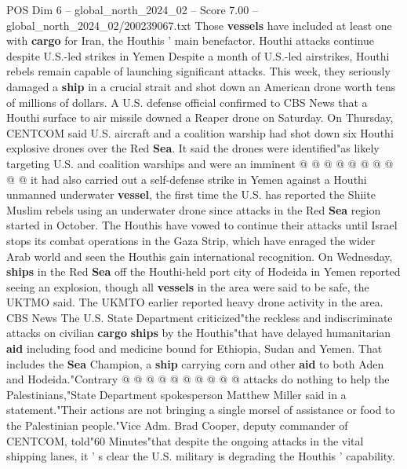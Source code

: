 \begin{textsample}{POS Dim 6 – global\_north\_2024\_02 – Score 7.00 – global\_north\_2024\_02/200239067.txt}
Those \textbf{vessels} have included at least one with \textbf{cargo} for Iran, the Houthis ' main benefactor.
Houthi attacks continue despite U.S.-led strikes in Yemen Despite a month of U.S.-led airstrikes, Houthi rebels remain capable of launching significant attacks.
This week, they seriously damaged a \textbf{ship} in a crucial strait and shot down an American drone worth tens of millions of dollars.
A U.S. defense official confirmed to CBS News that a Houthi surface to air missile downed a Reaper drone on Saturday.
On Thursday, CENTCOM said U.S. aircraft and a coalition warship had shot down six Houthi explosive drones over the Red \textbf{Sea}.
It said the drones were identified"as likely targeting U.S. and coalition warships and were an imminent @ @ @ @ @ @ @ @ @ @ it had also carried out a self-defense strike in Yemen against a Houthi unmanned underwater \textbf{vessel}, the first time the U.S. has reported the Shiite Muslim rebels using an underwater drone since attacks in the Red \textbf{Sea} region started in October.
The Houthis have vowed to continue their attacks until Israel stops its combat operations in the Gaza Strip, which have enraged the wider Arab world and seen the Houthis gain international recognition.
On Wednesday, \textbf{ships} in the Red \textbf{Sea} off the Houthi-held port city of Hodeida in Yemen reported seeing an explosion, though all \textbf{vessels} in the area were said to be safe, the UKTMO said.
The UKMTO earlier reported heavy drone activity in the area.
CBS News The U.S.
State Department criticized"the reckless and indiscriminate attacks on civilian \textbf{cargo} \textbf{ships} by the Houthis"that have delayed humanitarian \textbf{aid} including food and medicine bound for Ethiopia, Sudan and Yemen.
That includes the \textbf{Sea} Champion, a \textbf{ship} carrying corn and other \textbf{aid} to both Aden and Hodeida."Contrary @ @ @ @ @ @ @ @ @ @ attacks do nothing to help the Palestinians,"State Department spokesperson Matthew Miller said in a statement."Their actions are not bringing a single morsel of assistance or food to the Palestinian people."Vice Adm.
Brad Cooper, deputy commander of CENTCOM, told"60 Minutes"that despite the ongoing attacks in the vital shipping lanes, it ' s clear the U.S. military is degrading the Houthis ' capability.

\end{textsample}
